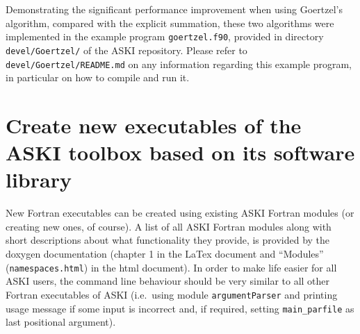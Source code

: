 \documentclass[12pt,a4paper]{article}
\newcommand{\lcode}[1]{\nolinkurl{#1}}
\newcommand{\ASKI}{ {\ttfamily ASKI} }
\begin{document}
Demonstrating the significant performance improvement when using Goertzel's algorithm, compared with the
explicit summation, these two algorithms were implemented in the example
program \lcode{goertzel.f90}, provided in directory \lcode{devel/Goertzel/} of the \ASKI{} repository. Please 
refer to \lcode{devel/Goertzel/README.md} on any information regarding this example program, in particular 
on how to compile and run it.


\section{Create new executables of the \ASKI{} toolbox based on its software library} \label{sec:executables}
%
New Fortran executables can be created using existing \ASKI{} Fortran modules (or creating new ones, of course). 
A list of all \ASKI{} Fortran modules along with short descriptions about what functionality they provide, is
provided by the doxygen documentation (chapter 1 in the LaTex document and ``Modules'' (\lcode{namespaces.html})
in the html document).
In order to make life easier for all \ASKI{} users, the command line behaviour should be very similar to all
other Fortran executables of \ASKI{} (i.e.\ using module \lcode{argumentParser} and printing usage message
if some input is incorrect and, if required, setting \lcode{main_parfile} as last positional argument).
\end{document}
